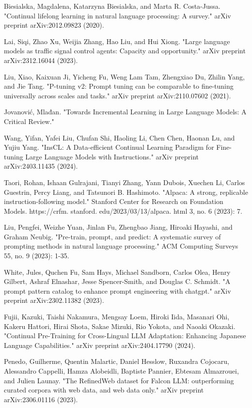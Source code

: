 \documentclass[runningheads]{llncs}
\begin{document}
\begin{thebibliography}{8}
Biesialska, Magdalena, Katarzyna Biesialska, and Marta R. Costa-Jussa. "Continual lifelong learning in natural language processing: A survey." arXiv preprint arXiv:2012.09823 (2020).

Lai, Siqi, Zhao Xu, Weijia Zhang, Hao Liu, and Hui Xiong. "Large language models as traffic signal control agents: Capacity and opportunity." arXiv preprint arXiv:2312.16044 (2023).

Liu, Xiao, Kaixuan Ji, Yicheng Fu, Weng Lam Tam, Zhengxiao Du, Zhilin Yang, and Jie Tang. "P-tuning v2: Prompt tuning can be comparable to fine-tuning universally across scales and tasks." arXiv preprint arXiv:2110.07602 (2021).

Jovanović, Mlađan. "Towards Incremental Learning in Large Language Models: A Critical Review."

Wang, Yifan, Yafei Liu, Chufan Shi, Haoling Li, Chen Chen, Haonan Lu, and Yujiu Yang. "InsCL: A Data-efficient Continual Learning Paradigm for Fine-tuning Large Language Models with Instructions." arXiv preprint arXiv:2403.11435 (2024).

Taori, Rohan, Ishaan Gulrajani, Tianyi Zhang, Yann Dubois, Xuechen Li, Carlos Guestrin, Percy Liang, and Tatsunori B. Hashimoto. "Alpaca: A strong, replicable instruction-following model." Stanford Center for Research on Foundation Models. https://crfm. stanford. edu/2023/03/13/alpaca. html 3, no. 6 (2023): 7.

Liu, Pengfei, Weizhe Yuan, Jinlan Fu, Zhengbao Jiang, Hiroaki Hayashi, and Graham Neubig. "Pre-train, prompt, and predict: A systematic survey of prompting methods in natural language processing." ACM Computing Surveys 55, no. 9 (2023): 1-35.

White, Jules, Quchen Fu, Sam Hays, Michael Sandborn, Carlos Olea, Henry Gilbert, Ashraf Elnashar, Jesse Spencer-Smith, and Douglas C. Schmidt. "A prompt pattern catalog to enhance prompt engineering with chatgpt." arXiv preprint arXiv:2302.11382 (2023).

Fujii, Kazuki, Taishi Nakamura, Mengsay Loem, Hiroki Iida, Masanari Ohi, Kakeru Hattori, Hirai Shota, Sakae Mizuki, Rio Yokota, and Naoaki Okazaki. "Continual Pre-Training for Cross-Lingual LLM Adaptation: Enhancing Japanese Language Capabilities." arXiv preprint arXiv:2404.17790 (2024).

Penedo, Guilherme, Quentin Malartic, Daniel Hesslow, Ruxandra Cojocaru, Alessandro Cappelli, Hamza Alobeidli, Baptiste Pannier, Ebtesam Almazrouei, and Julien Launay. "The RefinedWeb dataset for Falcon LLM: outperforming curated corpora with web data, and web data only." arXiv preprint arXiv:2306.01116 (2023).
\end{thebibliography}
\end{document}
